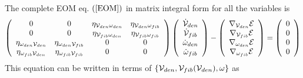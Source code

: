 The complete EOM eq. $\left( \ref{EOM}\right) $ in matrix integral form for
all the variables is 
\begin{equation}
\left( 
\begin{array}{cccc}
0 & 0 & \eta _{{\cal V}_{den}\omega _{den}} & \eta _{{\cal V}_{den}\omega
_{fib}} \\ 
0 & 0 & \eta _{{\cal V}_{fib}\omega _{den}} & \eta _{{\cal V}_{fib}\omega
_{fib}} \\ 
\eta _{\omega _{den}{\cal V}_{den}} & \eta _{\omega _{den}{\cal V}_{fib}} & 0
& 0 \\ 
\eta _{\omega _{fib}{\cal V}_{den}} & \eta _{\omega _{fib}{\cal V}_{fib}} & 0
& 0%
\end{array}%
\right) \left( 
\begin{array}{c}
{\cal \dot{V}}_{den} \\ 
{\cal \dot{V}}_{fib} \\ 
\dot{\omega}_{den} \\ 
\dot{\omega}_{fib}%
\end{array}%
\right) -\left( 
\begin{array}{c}
\nabla _{{\cal V}_{den}}{\cal E} \\ 
\nabla _{{\cal V}_{fib}}{\cal E} \\ 
\nabla _{\omega _{den}}{\cal E} \\ 
\nabla _{\omega _{fib}}{\cal E}%
\end{array}%
\right) =\left( 
\begin{array}{c}
0 \\ 
0 \\ 
0 \\ 
0%
\end{array}%
\right)
\end{equation}%
This equation can be written in terms of $\left\{ {\cal V}_{den},{\cal V}%
_{fib}({\cal V}_{den}),\omega \right\} $ as%
